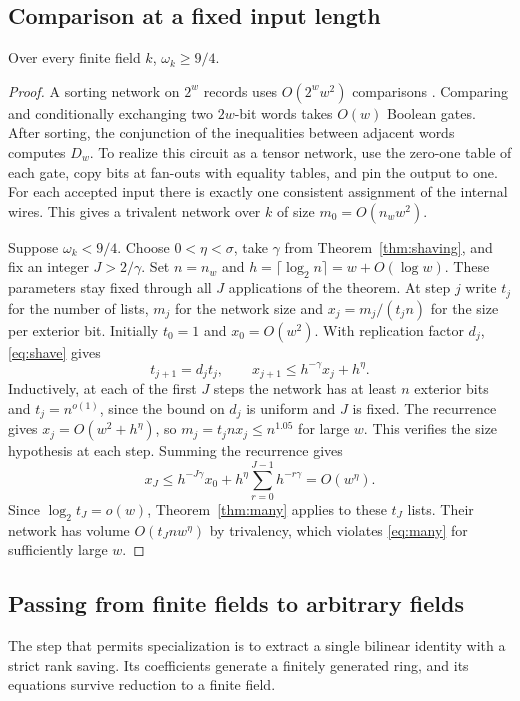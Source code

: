\subsection{Comparison at a fixed input length}
\begin{proposition}\label{prop:finitefield}
Over every finite field \(k\), \(\omega_k\ge 9/4\).
\end{proposition}
\begin{proof}
A sorting network on \(2^w\) records uses \(O(2^w w^2)\) comparisons
\citep{batcher}. Comparing and conditionally exchanging two \(2w\)-bit
words takes \(O(w)\) Boolean gates. After sorting, the conjunction of
the inequalities between adjacent words computes \(D_w\). To realize
this circuit as a tensor network, use the zero-one table of each gate,
copy bits at fan-outs with equality tables, and pin the output to one.
For each accepted input there is exactly one consistent assignment of
the internal wires. This gives a trivalent network over \(k\) of size
\(m_0=O(n_w w^2)\).

Suppose \(\omega_k<9/4\). Choose \(0<\eta<\sigma\), take \(\gamma\)
from Theorem~\ref{thm:shaving}, and fix an integer \(J>2/\gamma\).
Set \(n=n_w\) and \(h=\lceil\log_2 n\rceil=w+O(\log w)\). These
parameters stay fixed through all \(J\) applications of the theorem.
At step \(j\) write \(t_j\) for the number of lists, \(m_j\) for the
network size and \(x_j=m_j/(t_jn)\) for the size per exterior bit.
Initially \(t_0=1\) and \(x_0=O(w^2)\). With replication factor \(d_j\),
\eqref{eq:shave} gives
\[
         t_{j+1}=d_jt_j,\qquad
         x_{j+1}\le h^{-\gamma}x_j+h^\eta .
\]
Inductively, at each of the first \(J\) steps the network has at least
\(n\) exterior bits and \(t_j=n^{o(1)}\), since the bound on \(d_j\)
is uniform and \(J\) is fixed. The recurrence gives
\(x_j=O(w^2+h^\eta)\), so \(m_j=t_j n x_j\le n^{1.05}\) for large \(w\).
This verifies the size hypothesis at each step. Summing the recurrence gives
\[
       x_J \le h^{-J\gamma}x_0+
                     h^\eta\sum_{r=0}^{J-1}h^{-r\gamma}
               = O(w^\eta).
\]
Since \(\log_2 t_J=o(w)\), Theorem~\ref{thm:many} applies to these
\(t_J\) lists. Their network has volume \(O(t_J n w^\eta)\) by
trivalency, which violates \eqref{eq:many} for sufficiently large \(w\).
\end{proof}

\subsection{Passing from finite fields to arbitrary fields}
The step that permits specialization is to extract a single bilinear
identity with a strict rank saving. Its coefficients generate a
finitely generated ring, and its equations survive reduction to a finite field.

